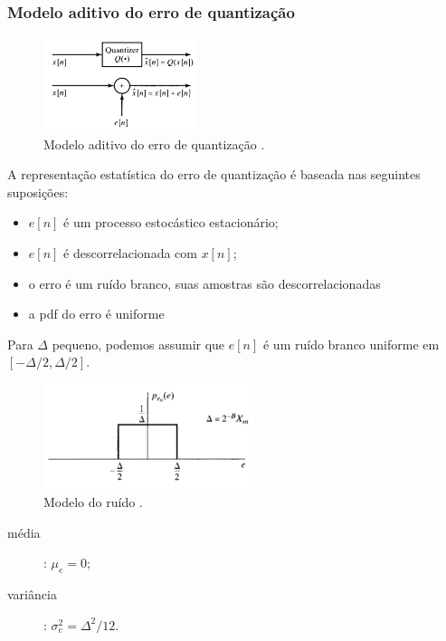 \begin{frame}[allowframebreaks]
  \frametitle{Modelo aditivo do erro de quantização}
  \begin{figure}[h!]
  \centering
  \includegraphics[width=0.4\textwidth]{images/oppenheim_fig450.png}
  \caption{Modelo aditivo do erro de quantização \citep{oppenheim2009}.}
  \label{fig:oppenheim_fig450}
  \end{figure}

  \vspace{-2ex}
  \begin{small}
  A representação estatística do erro de quantização é baseada nas seguintes suposições:
  \begin{itemize}
  \item $e[n]$ é um processo estocástico estacionário;
  \item $e[n]$ é descorrelacionada com $x[n]$;
  \item o erro é um ruído branco, suas amostras são descorrelacionadas
  \item a pdf do erro é uniforme 
  \end{itemize}
  \end{small}
  
  \framebreak

  Para $\Delta$ pequeno, podemos assumir que $e[n]$ é um ruído branco uniforme em $[-\Delta/2, \Delta/2]$.

  \begin{figure}[h!]
  \centering
  \includegraphics[width=0.55\textwidth]{images/oppenheim_fig452.png}
  \caption{Modelo do ruído \citep{oppenheim2009}.}
  \label{fig:oppenheim_fig452}
  \end{figure}

  \begin{description}
  \item[média]: $\mu_e = 0$;
  \item[variância]: $\sigma_e^2 = \Delta^2/12$.
  \end{description}


\end{frame}
